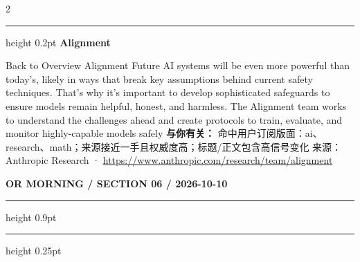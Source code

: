 \documentclass[10.5pt]{ctexart}
\begin{document}
\begin{multicols}{2}
\vspace{2mm}
\hrule height 0.2pt
\vspace{2mm}
{\large\bfseries Alignment}\par
Back to Overview Alignment Future AI systems will be even more powerful than today’s, likely in ways that break key assumptions behind current safety techniques. That’s why it’s important to develop sophisticated safeguards to ensure models remain helpful, honest, and harmless. The Alignment team works to understand the challenges ahead and create protocols to train, evaluate, and monitor highly-capable models safely
\textbf{与你有关：} 命中用户订阅版面：ai、research、math；来源接近一手且权威度高；标题/正文包含高信号变化
{\footnotesize\color{ormuted} 来源：Anthropic Research · \url{https://www.anthropic.com/research/team/alignment}}
\end{multicols}
\newpage
{\small\bfseries OR MORNING / SECTION 06 / 2026-10-10}
\vspace{2mm}
\hrule height 0.9pt
\vspace{1.5mm}
\hrule height 0.25pt
\vspace{4mm}
\end{document}

